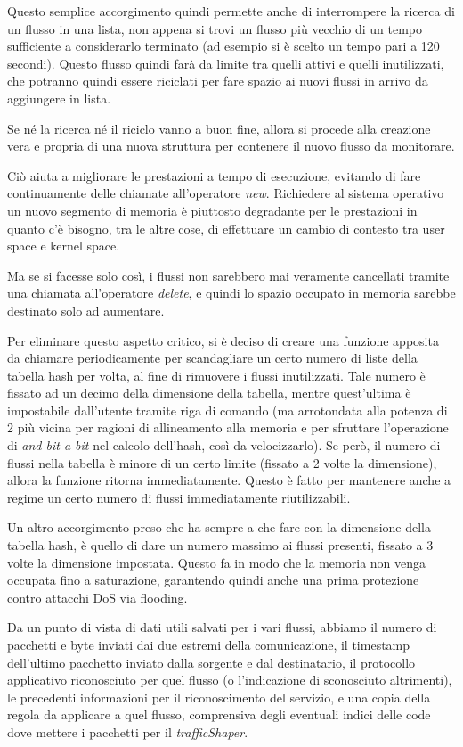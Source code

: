 Questo semplice accorgimento quindi permette anche di interrompere la ricerca di un flusso in una lista, non appena si trovi un flusso più vecchio di un tempo sufficiente a considerarlo terminato (ad esempio si è scelto un tempo pari a 120 secondi). Questo flusso quindi farà da limite tra quelli attivi e quelli inutilizzati, che potranno quindi essere riciclati per fare spazio ai nuovi flussi in arrivo da aggiungere in lista.

Se né la ricerca né il riciclo vanno a buon fine, allora si procede alla creazione vera e propria di una nuova struttura per contenere il nuovo flusso da monitorare.

Ciò aiuta a migliorare le prestazioni a tempo di esecuzione, evitando di fare continuamente delle chiamate all'operatore \emph{new}. Richiedere al sistema operativo un nuovo segmento di memoria è piuttosto degradante per le prestazioni in quanto c'è bisogno, tra le altre cose, di effettuare un cambio di contesto tra user space e kernel space.

Ma se si facesse solo così, i flussi non sarebbero mai veramente cancellati tramite una chiamata all'operatore \emph{delete}, e quindi lo spazio occupato in memoria sarebbe destinato solo ad aumentare.

Per eliminare questo aspetto critico, si è deciso di creare una funzione apposita da chiamare periodicamente per scandagliare un certo numero di liste della tabella hash per volta, al fine di rimuovere i flussi inutilizzati. Tale numero è fissato ad un decimo della dimensione della tabella, mentre quest'ultima è impostabile dall'utente tramite riga di comando (ma arrotondata alla potenza di 2 più vicina per ragioni di allineamento alla memoria e per sfruttare l'operazione di \emph{and bit a bit} nel calcolo dell'hash, così da velocizzarlo). Se però, il numero di flussi nella  tabella è minore di un certo limite (fissato a 2 volte la dimensione), allora la funzione ritorna immediatamente. Questo è fatto per mantenere anche a regime un certo numero di flussi immediatamente riutilizzabili.

Un altro accorgimento preso che ha sempre a che fare con la dimensione della tabella hash, è quello di dare un numero massimo ai flussi presenti, fissato a 3 volte la dimensione impostata. Questo fa in modo che la memoria non venga occupata fino a saturazione, garantendo quindi anche una prima protezione contro attacchi DoS via flooding.

Da un punto di vista di dati utili salvati per i vari flussi, abbiamo il numero di pacchetti e byte inviati dai due estremi della comunicazione, il timestamp dell'ultimo pacchetto inviato dalla sorgente e dal destinatario, il protocollo applicativo riconosciuto per quel flusso (o l'indicazione di sconosciuto altrimenti),  le precedenti informazioni per il riconoscimento del servizio, e una copia della regola da applicare a quel flusso, comprensiva degli eventuali indici delle code dove mettere i pacchetti per il \emph{trafficShaper}.

